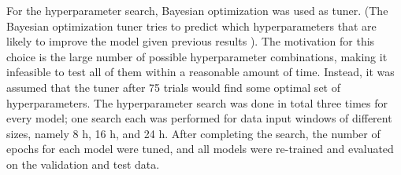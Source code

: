 For the hyperparameter search, Bayesian optimization was used as tuner. (The Bayesian optimization tuner tries to predict which hyperparameters that are likely to improve the model given previous results \cite{omalley2019kerastuner}). The motivation for this choice is the large number of possible hyperparameter combinations, making it infeasible to test all of them within a reasonable amount of time. Instead, it was assumed that the tuner after 75 trials would find some optimal set of hyperparameters. 
The hyperparameter search was done in total three times for every model; one search each was performed for data input windows of different sizes, namely 8 h, 16 h, and 24 h. After completing the search, the number of epochs for each model were tuned, and all models were re-trained and evaluated on the validation and test data. 



